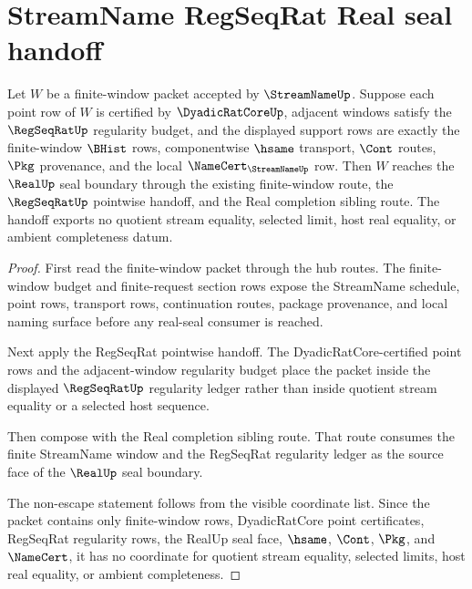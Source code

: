 \section{StreamName RegSeqRat Real seal handoff}
\label{sec:streamname-regseqrat-real-seal-handoff}

\begin{theorem}
\label{thm:streamname-regseqrat-real-seal-handoff}
Let $W$ be a finite-window packet accepted by $\StreamNameUp$. Suppose each point row of $W$ is certified by $\DyadicRatCoreUp$, adjacent windows satisfy the $\RegSeqRatUp$ regularity budget, and the displayed support rows are exactly the finite-window $\BHist$ rows, componentwise $\hsame$ transport, $\Cont$ routes, $\Pkg$ provenance, and the local $\NameCert_{\StreamNameUp}$ row. Then $W$ reaches the $\RealUp$ seal boundary through the existing finite-window route, the $\RegSeqRatUp$ pointwise handoff, and the Real completion sibling route. The handoff exports no quotient stream equality, selected limit, host real equality, or ambient completeness datum.
\end{theorem}
\begin{proof}
First read the finite-window packet through the hub routes. The finite-window budget and finite-request section rows expose the StreamName schedule, point rows, transport rows, continuation routes, package provenance, and local naming surface before any real-seal consumer is reached.

Next apply the RegSeqRat pointwise handoff. The DyadicRatCore-certified point rows and the adjacent-window regularity budget place the packet inside the displayed $\RegSeqRatUp$ regularity ledger rather than inside quotient stream equality or a selected host sequence.

Then compose with the Real completion sibling route. That route consumes the finite StreamName window and the RegSeqRat regularity ledger as the source face of the $\RealUp$ seal boundary.

The non-escape statement follows from the visible coordinate list. Since the packet contains only finite-window rows, DyadicRatCore point certificates, RegSeqRat regularity rows, the RealUp seal face, $\hsame$, $\Cont$, $\Pkg$, and $\NameCert$, it has no coordinate for quotient stream equality, selected limits, host real equality, or ambient completeness.
\end{proof}

